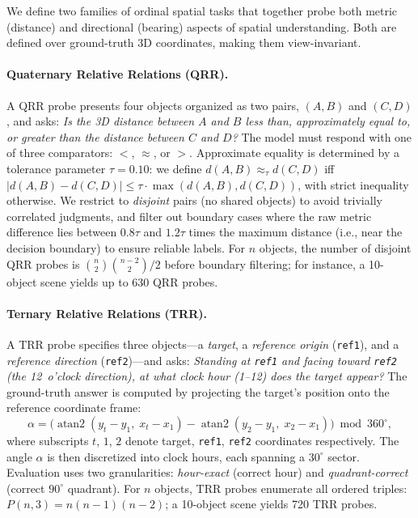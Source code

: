 We define two families of ordinal spatial tasks that together probe both metric (distance) and directional (bearing) aspects of spatial understanding. Both are defined over ground-truth 3D coordinates, making them view-invariant.

\paragraph{Quaternary Relative Relations (QRR).}
A QRR probe presents four objects organized as two pairs, $(A, B)$ and $(C, D)$, and asks: \emph{Is the 3D distance between $A$ and $B$ less than, approximately equal to, or greater than the distance between $C$ and $D$?} The model must respond with one of three comparators: $<$, $\approx$, or $>$. Approximate equality is determined by a tolerance parameter $\tau = 0.10$: we define $d(A,B) \approx_\tau d(C,D)$ iff $|d(A,B) - d(C,D)| \leq \tau \cdot \max(d(A,B), d(C,D))$, with strict inequality otherwise. We restrict to \emph{disjoint} pairs (no shared objects) to avoid trivially correlated judgments, and filter out boundary cases where the raw metric difference lies between $0.8\tau$ and $1.2\tau$ times the maximum distance (i.e., near the decision boundary) to ensure reliable labels. For $n$ objects, the number of disjoint QRR probes is $\binom{n}{2}\binom{n-2}{2}/2$ before boundary filtering; for instance, a 10-object scene yields up to 630 QRR probes.

\paragraph{Ternary Relative Relations (TRR).}
A TRR probe specifies three objects---a \emph{target}, a \emph{reference origin} (\texttt{ref1}), and a \emph{reference direction} (\texttt{ref2})---and asks: \emph{Standing at \texttt{ref1} and facing toward \texttt{ref2} (the 12~o'clock direction), at what clock hour (1--12) does the target appear?} The ground-truth answer is computed by projecting the target's position onto the reference coordinate frame:
\begin{equation}
  \alpha = \bigl(\operatorname{atan2}(y_t - y_1,\; x_t - x_1) - \operatorname{atan2}(y_2 - y_1,\; x_2 - x_1)\bigr) \bmod 360^\circ,
  \label{eq:trr-angle}
\end{equation}
where subscripts $t$, $1$, $2$ denote target, \texttt{ref1}, \texttt{ref2} coordinates respectively. The angle $\alpha$ is then discretized into clock hours, each spanning a $30^\circ$ sector. Evaluation uses two granularities: \emph{hour-exact} (correct hour) and \emph{quadrant-correct} (correct $90^\circ$ quadrant). For $n$ objects, TRR probes enumerate all ordered triples: $P(n, 3) = n(n{-}1)(n{-}2)$; a 10-object scene yields 720 TRR probes.

